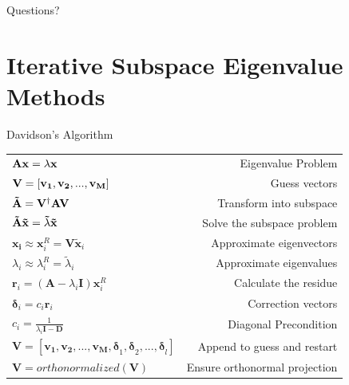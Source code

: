 \documentclass[10pt]{beamer}
\begin{document}
{{{{{{{{{{{%
\begin{frame}[standout]
  Questions?
\end{frame}


\appendix

\section{Iterative Subspace Eigenvalue Methods}
{%
\begin{frame}{Davidson's Algorithm}
  \begin{tabular}{l r}
    $\bf{Ax}=\lambda\bf{x}$         & Eigenvalue Problem \\
    $\bf{V}=[\bf{v_1,v_2,...,v_M}]$	& Guess vectors \\
    $\bf{\tilde{A}} = \bf{V}^\dag\bf{AV}$  & Transform into subspace\\ 
    $\bf{\tilde{A}\tilde{x}}=\tilde{\lambda}\bf{\tilde{x}}$ & Solve the subspace problem\\
  	$\mathbf{x_i} \approx \mathbf{x}_i^R = \mathbf{V\tilde{x}}_i$ & Approximate eigenvectors\\
  	$\lambda_i \approx \lambda_i^R = \tilde{\lambda}_i$ & Approximate eigenvalues \\
    $\mathbf{r}_i=\left(\mathbf{A}-\lambda_i\mathbf{I}\right)\mathbf{x}_i^R $ & Calculate the 
    residue \\
    $\mathbf{\delta}_i = c_i\mathbf{r}_i$ & Correction vectors \\
    $c_i = \frac{1}{\lambda_i\mathbf{I}-\mathbf{D}}$ & Diagonal Precondition \\
    $\mathbf{V} = 
    [\mathbf{v_1,v_2,...,v_M}\mathbf{,\delta}_1\mathbf{,\delta}_2,...\mathbf{,\delta}_l]$ & Append 
    to guess and restart \\ 
    $\mathbf{V} = orthonormalized(\mathbf{V})$ & Ensure orthonormal projection
  \end{tabular}
\end{frame}

{%
}}}}}}}}}}}}}
\end{document}

